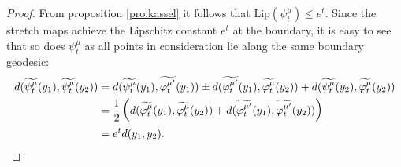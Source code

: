 \begin{proof}
  From proposition \ref{pro:kassel} it follows that $\text{Lip}(\psi^\mu_t)\leq e^t$. Since the stretch maps achieve the Lipschitz constant $e^t$ at the boundary, it is easy to see that so does $\psi^\mu_t$ as all points in consideration lie along the same boundary geodesic: 
  \begin{align*}
    d(\widetilde{\psi^\mu_t}(y_1), \widetilde{\psi^\mu_t}(y_2)) &= d(\widetilde{\psi^\mu_t}(y_1), \widetilde{\varphi^{\mu'}_t}(y_1)) \pm d(\widetilde{\varphi^{\mu'}_t}(y_1), \widetilde{\varphi^\mu_t}(y_2)) + d(\widetilde{\psi^\mu_t}(y_2), \widetilde{\varphi^{\mu}_t}(y_2))\\
        &= \frac{1}{2}\left(d(\widetilde{\varphi^\mu_t}(y_1), \widetilde{\varphi^{\mu}_t}(y_2)) + d(\widetilde{\varphi^{\mu'}_t}(y_1), \widetilde{\varphi^{\mu'}_t}(y_2))\right)\\
                          &= e^td(y_1,y_2).
  \end{align*}
\end{proof}

